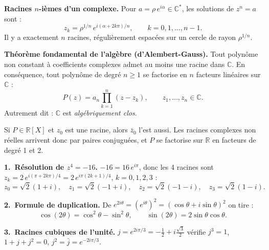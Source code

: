 \begin{tcolorbox}[thmbox]
  \textbf{Racines $n$-ièmes d'un complexe.}\enspace{}
  Pour $a = \rho\,e^{i\alpha} \in \mathbb{C}^*$, les solutions de $z^n = a$ sont :
  \[
    z_k = \rho^{1/n}\,e^{i(\alpha + 2k\pi)/n}, \qquad k = 0, 1, \ldots, n-1.
  \]
  Il y a exactement $n$ racines, régulièrement espacées sur un cercle de rayon $\rho^{1/n}$.
\end{tcolorbox}

\begin{tcolorbox}[thmbox]
  \textbf{Théorème fondamental de l'algèbre (d'Alembert-Gauss).}%
  \enspace{}
  Tout polynôme non constant à coefficients complexes admet au moins une racine dans $\mathbb{C}$.
  En conséquence, tout polynôme de degré $n\geq 1$ se factorise en $n$ facteurs linéaires sur $\mathbb{C}$ :
  \[
    P(z) = a_n\prod_{k=1}^{n}(z - z_k), \qquad z_1,\ldots,z_n \in \mathbb{C}.
  \]
  Autrement dit : $\mathbb{C}$ est \emph{algébriquement clos}.
\end{tcolorbox}

Si $P\in\mathbb{R}[X]$ et $z_0$ est une racine, alors $\bar z_0$ l'est aussi.
Les racines complexes non réelles arrivent donc par paires conjuguées,
et $P$ se factorise sur $\mathbb{R}$ en facteurs de degré 1 et 2.

\decsep{}



\begin{mdframed}[style=exbar]
  \textbf{1.\ Résolution de $z^4 = -16$.}\enspace{}
  $-16 = 16\,e^{i\pi}$, donc les 4 racines sont
  $z_k = 2\,e^{i(\pi+2k\pi)/4} = 2\,e^{i\pi(2k+1)/4}$, $k=0,1,2,3$ :
  \[
    z_0 = \sqrt{2}(1+i),\quad z_1 = \sqrt{2}(-1+i),\quad
    z_2 = \sqrt{2}(-1-i),\quad z_3 = \sqrt{2}(1-i).
  \]

  \smallskip\noindent
  \textbf{2.\ Formule de duplication.}\enspace{}
  De $e^{2i\theta} = {(e^{i\theta})}^2 = {(\cos\theta+i\sin\theta)}^2$ on tire :
  \[
    \cos(2\theta) = \cos^2\theta - \sin^2\theta, \qquad
    \sin(2\theta) = 2\sin\theta\cos\theta.
  \]

  \smallskip\noindent
  \textbf{3.\ Racines cubiques de l'unité.}\enspace{}
  $j = e^{2i\pi/3} = -\tfrac{1}{2}+i\tfrac{\sqrt{3}}{2}$ vérifie
  $j^3=1$, $1+j+j^2=0$, $j^2 = \bar j = e^{-2i\pi/3}$.
\end{mdframed}

